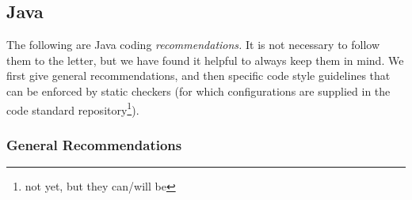 \subsection{Java}



\lstset{style=custom-java}

The following are Java coding \textit{recommendations.} It is not necessary to follow them to the letter, but we have found it helpful to always keep them in mind. We first give general recommendations, and then specific code style guidelines that can be enforced by static checkers (for which configurations are supplied in the code standard repository\footnote{not yet, but they can/will be}).
%
\subsubsection{General Recommendations}
\label{sec:java:general}

